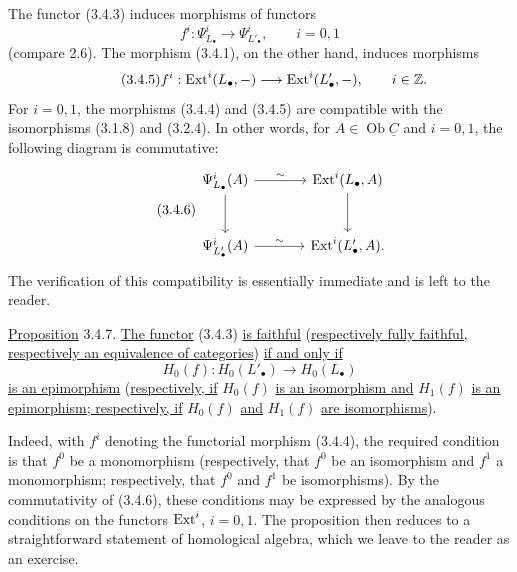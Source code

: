 The functor (3.4.3) induces morphisms of functors
\begin{equation}\tag{3.4.4}
 f^i:\Psi^i_{L_\bullet}\longrightarrow\Psi^i_{L'_\bullet},
 \qquad i=0,1
\end{equation}
(compare 2.6). The morphism (3.4.1), on the other hand, induces
morphisms
\begin{equation}\tag{3.4.5}
 f^i:\operatorname{Ext}^i(L_\bullet,-)\longrightarrow\operatorname{Ext}^i(L'_\bullet,-),
 \qquad i\in\mathbb Z.
\end{equation}
For $i=0,1$, the morphisms (3.4.4) and (3.4.5) are compatible with
the isomorphisms (3.1.8) and (3.2.4). In other words, for
$A\in\operatorname{Ob}\underline C$ and $i=0,1$, the following
diagram is commutative:
\begin{equation}\tag{3.4.6}
\begin{tikzcd}[column sep=large,row sep=large]
 \Psi^i_{L_\bullet}(A)\arrow[r,"\sim"]\arrow[d]
 &\Ext^i(L_\bullet,A)\arrow[d]\\
 \Psi^i_{L'_\bullet}(A)\arrow[r,"\sim"]
 &\Ext^i(L'_\bullet,A).
\end{tikzcd}
\end{equation}
The verification of this compatibility is essentially immediate and
is left to the reader.

\underline{Proposition} 3.4.7. \underline{The functor} (3.4.3)
\underline{is faithful} (\underline{respectively fully faithful,
respectively an equivalence of categories}) \underline{if and only
if}
\[
 H_0(f):H_0(L'_\bullet)\longrightarrow H_0(L_\bullet)
\]
\underline{is an epimorphism} (\underline{respectively, if}
$H_0(f)$ \underline{is an isomorphism and} $H_1(f)$
\underline{is an epimorphism; respectively, if} $H_0(f)$
\underline{and} $H_1(f)$ \underline{are isomorphisms}).

Indeed, with $f^i$ denoting the functorial morphism (3.4.4), the
required condition is that $f^0$ be a monomorphism (respectively,
that $f^0$ be an isomorphism and $f^1$ a monomorphism; respectively,
that $f^0$ and $f^1$ be isomorphisms). By the commutativity of
(3.4.6), these conditions may be expressed by the analogous
conditions on the functors $\operatorname{Ext}^i$, $i=0,1$. The proposition then
reduces to a straightforward statement of homological algebra,
which we leave to the reader as an exercise.

